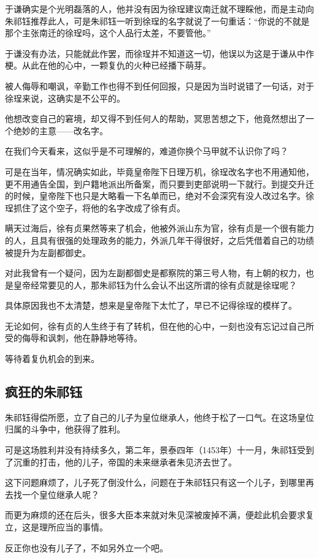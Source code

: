 \begin{multicols}{\theparacolNo}
于谦确实是个光明磊落的人，他并没有因为徐珵建议南迁就不理睬他，而是主动向朱祁钰推荐此人，可是朱祁钰一听到徐珵的名字就说了一句重话：“你说的不就是那个主张南迁的徐珵吗，这个人品行太差，不要管他。”

于谦没有办法，只能就此作罢，而徐珵并不知道这一切，他误以为这是于谦从中作梗。从此在他的心中，一颗复仇的火种已经播下萌芽。

被人侮辱和嘲讽，辛勤工作也得不到任何回报，只是因为当时说错了一句话，对于徐珵来说，这确实是不公平的。

他想改变自己的窘境，却又得不到任何人的帮助，冥思苦想之下，他竟然想出了一个绝妙的主意——改名字。

在我们今天看来，这似乎是不可理解的，难道你换个马甲就不认识你了吗？

可是在当年，情况确实如此，毕竟皇帝陛下日理万机，徐珵改名字也不用通知他，更不用通告全国，到户籍地派出所备案，而只要到吏部说明一下就行。到提交升迁的时候，皇帝陛下也只是大略看一下名单而已，绝对不会深究有没人改过名字。徐珵抓住了这个空子，将他的名字改成了徐有贞。

瞒天过海后，徐有贞果然等来了机会，他被外派山东为官，徐有贞是一个很有能力的人，且具有很强的处理政务的能力，外派几年干得很好，之后凭借着自己的功绩被提升为左副都御史。

对此我曾有一个疑问，因为左副都御史是都察院的第三号人物，有上朝的权力，也是皇帝经常要见的人，那朱祁钰为什么会认不出这所谓的徐有贞就是徐珵呢？

具体原因我也不太清楚，想来是皇帝陛下太忙了，早已不记得徐珵的模样了。

无论如何，徐有贞的人生终于有了转机，但在他的心中，一刻也没有忘记过自己所受的侮辱和讽刺，他在静静地等待。

等待着复仇机会的到来。

\subsection{疯狂的朱祁钰}
朱祁钰得偿所愿，立了自己的儿子为皇位继承人，他终于松了一口气。在这场皇位归属的斗争中，他获得了胜利。

可是这场胜利并没有持续多久，第二年，景泰四年（1453年）十一月，朱祁钰受到了沉重的打击，他的儿子，帝国的未来继承者朱见济去世了。

这下问题麻烦了，儿子死了倒没什么，问题在于朱祁钰只有这一个儿子，到哪里再去找一个皇位继承人呢？

而更为麻烦的还在后头，很多大臣本来就对朱见深被废掉不满，便趁此机会要求复立，这是理所应当的事情。

反正你也没有儿子了，不如另外立一个吧。


\end{multicols}
